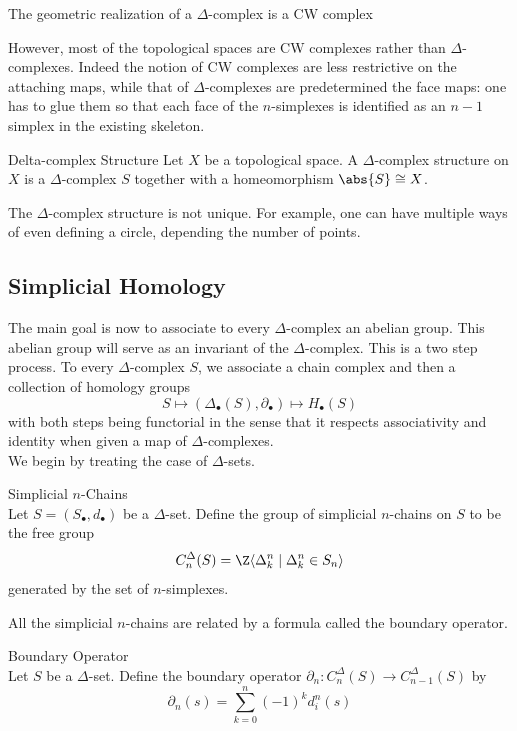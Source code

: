 \documentclass[a4paper]{article}
\begin{document}
\begin{thm}{}{} The geometric realization of a $\Delta$-complex is a CW complex
\end{thm}

However, most of the topological spaces are CW complexes rather than $\Delta$-complexes. Indeed the notion of CW complexes are less restrictive on the attaching maps, while that of $\Delta$-complexes are predetermined the face maps: one has to glue them so that each face of the $n$-simplexes is identified as an $n-1$ simplex in the existing skeleton. 

\begin{defn}{Delta-complex Structure}{} Let $X$ be a topological space. A $\Delta$-complex structure on $X$ is a $\Delta$-complex $S$ together with a homeomorphism $\abs{S}\cong X$. 
\end{defn}

The $\Delta$-complex structure is not unique. For example, one can have multiple ways of even defining a circle, depending the number of points. 

\subsection{Simplicial Homology}
The main goal is now to associate to every $\Delta$-complex an abelian group. This abelian group will serve as an invariant of the $\Delta$-complex. This is a two step process. To every $\Delta$-complex $S$, we associate a chain complex and then a collection of homology groups $$S\mapsto(\Delta_\bullet(S),\partial_\bullet)\mapsto H_\bullet(S)$$ with both steps being functorial in the sense that it respects associativity and identity when given a map of $\Delta$-complexes. \\

We begin by treating the case of $\Delta$-sets. 

\begin{defn}{Simplicial $n$-Chains}{}\\
Let $S=(S_\bullet,d_\bullet)$ be a $\Delta$-set. Define the group of simplicial $n$-chains on $S$ to be the free group $$C_n^\Delta(S)=\Z\langle\Delta_k^n\;|\;\Delta_k^n\in S_n\rangle$$ generated by the set of $n$-simplexes. 
\end{defn}

All the simplicial $n$-chains are related by a formula called the boundary operator. 

\begin{defn}{Boundary Operator}{}\\
Let $S$ be a $\Delta$-set. Define the boundary operator $\partial_n:C_n^\Delta(S)\to C_{n-1}^\Delta(S)$ by $$\partial_n(s)=\sum_{k=0}^n(-1)^kd_i^n(s)$$
\end{defn}
\end{document}
